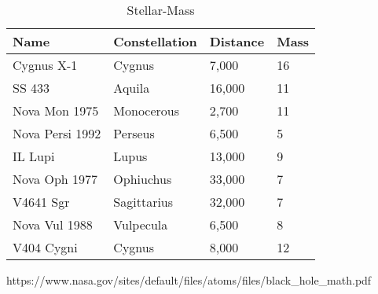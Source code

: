 \begin{table}
	{ \renewcommand{\arraystretch}{1.4}
\begin{tabular}{|l|l|l|l|}
\hline

Name & Constellation & Distance & Mass \\
\hline

Cygnus X-1 & Cygnus & 7,000 & 16 \\
\hline

SS 433 & Aquila & 16,000 & 11 \\
\hline

Nova Mon 1975 & Monocerous & 2,700 & 11 \\
\hline

Nova Persi 1992 & Perseus & 6,500 & 5 \\
\hline

IL Lupi & Lupus & 13,000 & 9 \\
\hline

Nova Oph 1977 & Ophiuchus & 33,000 & 7 \\
\hline

V4641 Sgr & Sagittarius & 32,000 & 7 \\
\hline

Nova Vul 1988 & Vulpecula & 6,500 & 8 \\
\hline

V404 Cygni & Cygnus & 8,000 & 12 \\



\hline
\end{tabular}}
\caption{Stellar-Mass}
\end{table}


https://www.nasa.gov/sites/default/files/atoms/files/black_hole_math.pdf

